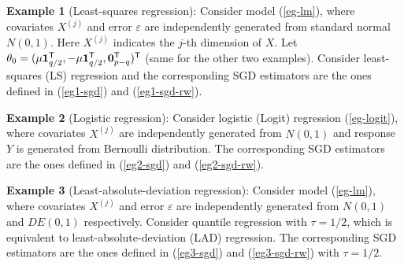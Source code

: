 \documentclass[12pt]{article}
\def\trans{^{\rm \textsf{T}}}
\begin{document}
{\bf Example 1} (Least-squares regression):  Consider model (\ref{eg-lm}), where covariates $X^{(j)}$ and error $\varepsilon$ are independently generated from standard normal $N(0,1)$. Here $X^{(j)}$ indicates the $j$-th dimension of $X$. Let $\theta_0=(\mu{\bf 1}\trans_{q/2},-\mu{\bf 1}\trans_{q/2},{\bf 0}\trans_{p-q})\trans$ (same for the other two examples). Consider least-squares (LS) regression and the corresponding SGD estimators are the ones defined in (\ref{eg1-sgd}) and (\ref{eg1-sgd-rw}).

{\bf Example 2} (Logistic regression): Consider logistic (Logit) regression (\ref{eg-logit}), where covariates $X^{(j)}$ are independently generated from $N(0,1)$ and response $Y$ is generated from Bernoulli distribution. The corresponding SGD estimators are the ones defined in (\ref{eg2-sgd}) and (\ref{eg2-sgd-rw}).

{\bf Example 3} (Least-absolute-deviation regression): Consider model (\ref{eg-lm}), where covariates $X^{(j)}$ and error $\varepsilon$ are independently generated from $N(0, 1)$ and $DE(0, 1)$ respectively. Consider quantile regression with $\tau=1/2$, which is equivalent to least-absolute-deviation (LAD) regression. The corresponding SGD estimators are the ones defined in (\ref{eg3-sgd}) and (\ref{eg3-sgd-rw}) with $\tau=1/2$.


%
\end{document}
